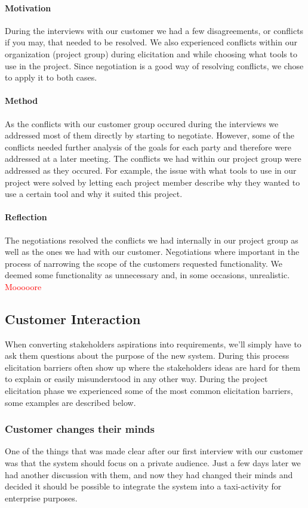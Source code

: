 \documentclass[10pt]{article}
\newcommand\todo[1]{\textcolor{red}{#1}}
\begin{document}
\paragraph{Motivation}
\hfill \break
During the interviews with our customer we had a few disagreements, or conflicts if you may, that needed to be resolved. We also experienced conflicts within our organization (project group) during elicitation and while choosing what tools to use in the project. Since negotiation is a good way of resolving conflicts, we chose to apply it to both cases.
\paragraph{Method}
\hfill \break
As the conflicts with our customer group occured during the interviews we addressed most of them directly by starting to negotiate. However, some of the conflicts needed further analysis of the goals for each party and therefore were addressed at a later meeting. The conflicts we had within our project group were addressed as they occured. For example, the issue with what tools to use in our project were solved by letting each project member describe why they wanted to use a certain tool and why it suited this project. 
\paragraph{Reflection}
\hfill \break
The negotiations resolved the conflicts we had internally in our project group as well as the ones we had with our customer. Negotiations where important in the process of narrowing the scope of the customers requested functionality. We deemed some functionality as unnecessary and, in some occasions, unrealistic.
\todo{Mooooore}

\subsection{Customer Interaction}
When converting stakeholders aspirations into requirements, we'll simply have to ask them questions about the purpose of the new system. During this process elicitation barriers often show up where the stakeholders ideas are hard for them to explain or easily misunderstood in any other way.
During the project elicitation phase we experienced some of the most common elicitation barriers, some examples are described below.

\subsubsection{Customer changes their minds}
One of the things that was made clear after our first interview with our customer was that the system should focus on a private audience. Just a few days later we had another discussion with them, and now they had changed their minds and decided it should be possible to integrate the system into a taxi-activity for enterprise purposes.
\end{document}
